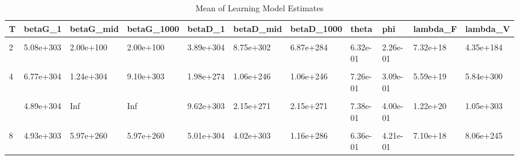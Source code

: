 \begin{table}[!h]
\centering
\caption{Mean of Learning Model Estimates}
\centering
\begin{tabular}[t]{lllllllllll}
\toprule
T & betaG\_1 & betaG\_mid & betaG\_1000 & betaD\_1 & betaD\_mid & betaD\_1000 & theta & phi & lambda\_F & lambda\_V\\
\midrule
\cellcolor{gray!10}{1} & \cellcolor{gray!10}{1.48e+304} & \cellcolor{gray!10}{3.91e+234} & \cellcolor{gray!10}{3.91e+234} & \cellcolor{gray!10}{4.87e+304} & \cellcolor{gray!10}{9.34e+303} & \cellcolor{gray!10}{5.20e+303} & \cellcolor{gray!10}{6.82e-01} & \cellcolor{gray!10}{5.33e-01} & \cellcolor{gray!10}{1.13e+16} & \cellcolor{gray!10}{4.46e+301}\\
2 & 5.08e+303 & 2.00e+100 & 2.00e+100 & 3.89e+304 & 8.75e+302 & 6.87e+284 & 6.32e-01 & 2.26e-01 & 7.32e+18 & 4.35e+184\\
\cellcolor{gray!10}{3} & \cellcolor{gray!10}{3.57e+304} & \cellcolor{gray!10}{9.20e+298} & \cellcolor{gray!10}{8.88e+297} & \cellcolor{gray!10}{2.75e+304} & \cellcolor{gray!10}{Inf} & \cellcolor{gray!10}{Inf} & \cellcolor{gray!10}{6.08e-01} & \cellcolor{gray!10}{5.03e-01} & \cellcolor{gray!10}{6.81e+20} & \cellcolor{gray!10}{7.95e+303}\\
4 & 6.77e+304 & 1.24e+304 & 9.10e+303 & 1.98e+274 & 1.06e+246 & 1.06e+246 & 7.26e-01 & 3.09e-01 & 5.59e+19 & 5.84e+300\\
\cellcolor{gray!10}{5} & \cellcolor{gray!10}{1.93e+304} & \cellcolor{gray!10}{4.58e+303} & \cellcolor{gray!10}{4.57e+303} & \cellcolor{gray!10}{1.44e+304} & \cellcolor{gray!10}{4.06e+164} & \cellcolor{gray!10}{4.06e+164} & \cellcolor{gray!10}{7.48e-01} & \cellcolor{gray!10}{3.30e-01} & \cellcolor{gray!10}{5.96e+19} & \cellcolor{gray!10}{6.62e+297}\\
\addlinespace
6 & 4.89e+304 & Inf & Inf & 9.62e+303 & 2.15e+271 & 2.15e+271 & 7.38e-01 & 4.00e-01 & 1.22e+20 & 1.05e+303\\
\cellcolor{gray!10}{7} & \cellcolor{gray!10}{5.09e+303} & \cellcolor{gray!10}{6.73e+301} & \cellcolor{gray!10}{6.75e+240} & \cellcolor{gray!10}{4.33e+304} & \cellcolor{gray!10}{Inf} & \cellcolor{gray!10}{Inf} & \cellcolor{gray!10}{6.10e-01} & \cellcolor{gray!10}{3.88e-01} & \cellcolor{gray!10}{2.19e+01} & \cellcolor{gray!10}{1.15e+298}\\
8 & 4.93e+303 & 5.97e+260 & 5.97e+260 & 5.01e+304 & 4.02e+303 & 1.16e+286 & 6.36e-01 & 4.21e-01 & 7.10e+18 & 8.06e+245\\
\bottomrule
\end{tabular}
\end{table}